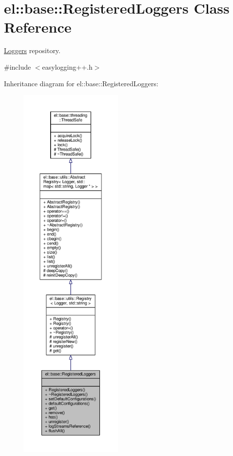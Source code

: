 \hypertarget{classel_1_1base_1_1RegisteredLoggers}{}\section{el\+:\+:base\+:\+:Registered\+Loggers Class Reference}
\label{classel_1_1base_1_1RegisteredLoggers}


\hyperlink{classel_1_1Loggers}{Loggers} repository.  




{\ttfamily \#include $<$easylogging++.\+h$>$}



Inheritance diagram for el\+:\+:base\+:\+:Registered\+Loggers\+:
\nopagebreak
\begin{figure}[H]
\begin{center}
\leavevmode
\includegraphics[height=550pt]{da/d9a/classel_1_1base_1_1RegisteredLoggers__inherit__graph}
\end{center}
\end{figure}


